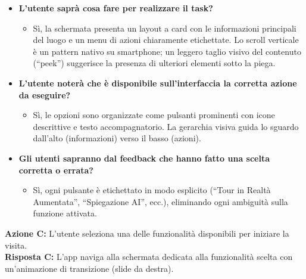 \begin{itemize}[nosep, leftmargin=1.6em]
    \item \textbf{L'utente saprà cosa fare per realizzare il task?}
    \begin{itemize}[nosep, leftmargin=1.6em]
        \item Sì, la schermata presenta un layout a card con le informazioni principali del luogo e un menu di azioni chiaramente etichettate. Lo scroll verticale è un pattern nativo su smartphone; un leggero taglio visivo del contenuto (``peek'') suggerisce la presenza di ulteriori elementi sotto la piega.
    \end{itemize}
    \item \textbf{L'utente noterà che è disponibile sull'interfaccia la corretta azione da eseguire?}
    \begin{itemize}[nosep, leftmargin=1.6em]
        \item Sì, le opzioni sono organizzate come pulsanti prominenti con icone descrittive e testo accompagnatorio. La gerarchia visiva guida lo sguardo dall'alto (informazioni) verso il basso (azioni).
    \end{itemize}
    \item \textbf{Gli utenti sapranno dal feedback che hanno fatto una scelta corretta o errata?}
    \begin{itemize}[nosep, leftmargin=1.6em]
        \item Sì, ogni pulsante è etichettato in modo esplicito (``Tour in Realtà Aumentata'', ``Spiegazione AI'', ecc.), eliminando ogni ambiguità sulla funzione attivata.
    \end{itemize}
\end{itemize}

\vspace{0.3cm}
\noindent\textbf{Azione C:} L'utente seleziona una delle funzionalità disponibili per iniziare la visita.\\
\textbf{Risposta C:} L'app naviga alla schermata dedicata alla funzionalità scelta con un'animazione di transizione (slide da destra).


